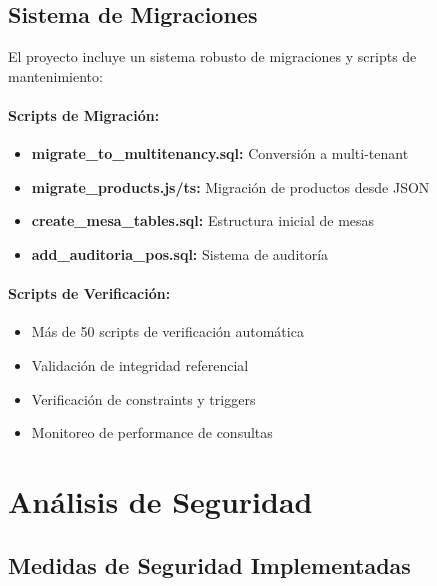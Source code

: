 \documentclass[12pt,a4paper]{article}
\begin{document}
\subsection{Sistema de Migraciones}

El proyecto incluye un sistema robusto de migraciones y scripts de mantenimiento:

\paragraph{Scripts de Migración:}
\begin{itemize}
    \item \textbf{migrate\_to\_multitenancy.sql:} Conversión a multi-tenant
    \item \textbf{migrate\_products.js/ts:} Migración de productos desde JSON
    \item \textbf{create\_mesa\_tables.sql:} Estructura inicial de mesas
    \item \textbf{add\_auditoria\_pos.sql:} Sistema de auditoría
\end{itemize}

\paragraph{Scripts de Verificación:}
\begin{itemize}
    \item Más de 50 scripts de verificación automática
    \item Validación de integridad referencial
    \item Verificación de constraints y triggers
    \item Monitoreo de performance de consultas
\end{itemize}

\section{Análisis de Seguridad}

\subsection{Medidas de Seguridad Implementadas}
\end{document}
